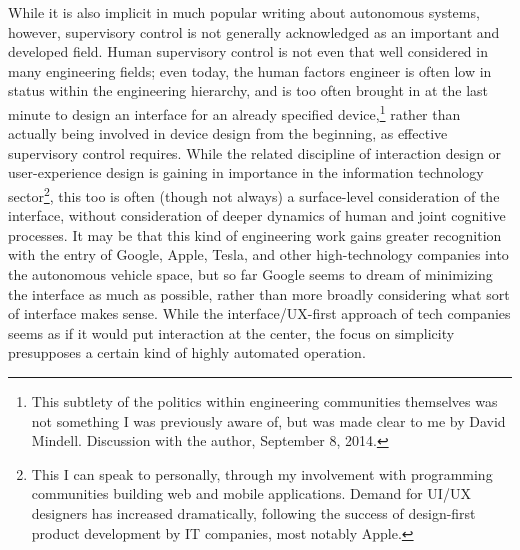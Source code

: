 
 While it is also
implicit in much popular writing about autonomous systems, however,
supervisory control is not generally acknowledged as an important and
developed field. Human supervisory control is not even that well
considered in many engineering fields; even today, the human factors
engineer is often low in status within the engineering hierarchy, and
is too often brought in at the last minute to design an interface for
an already specified device,\footnote{This subtlety of the politics
  within engineering communities themselves was not something I was
  previously aware of, but was made clear to me by David Mindell.
  Discussion with the author, September 8, 2014.} rather than actually
being involved in 
device design from the beginning, as effective supervisory control
requires. While the related discipline of interaction design or
user-experience design is gaining in importance in the information
technology sector\footnote{This I can speak to personally, through my
  involvement with programming communities building web and mobile
  applications. Demand for UI/UX designers has increased dramatically,
following the success of design-first product development by IT
companies, most notably Apple.}, this too is often (though not always)
a surface-level 
consideration of the interface, without consideration of deeper
dynamics of human and joint cognitive processes. It may be
that this kind of engineering work gains greater recognition with the
entry of Google, Apple, Tesla, and other high-technology companies
into the autonomous vehicle space, but so far Google seems to dream
of minimizing the interface as much as possible, rather than more
broadly considering what sort of interface makes sense.\cite{???}
While the interface/UX-first approach of tech companies seems as if it
would put interaction at the center, the focus on simplicity
presupposes a certain kind of highly automated operation.

